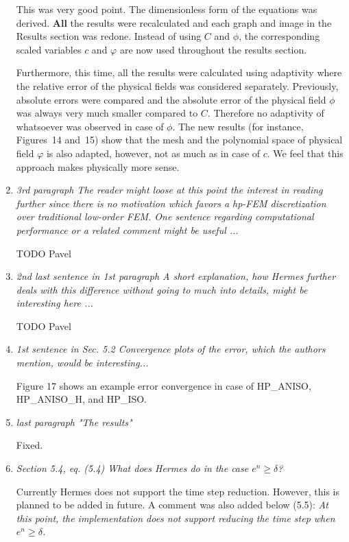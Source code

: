 \documentclass[mathpazo]{cicp}
\begin{document}
\begin{enumerate}
This was very good point. The dimensionless form of the equations was derived. $\mathbf{All}$ the
results were recalculated and each graph and image in the Results section was redone.
Instead of using $C$
and $\phi$, the corresponding scaled variables $c$ and $\varphi$ are now used throughout the results section.

Furthermore, this time, all the results were calculated using adaptivity where the relative error
of the physical fields was considered separately.  Previously, absolute errors were compared
and the absolute error of the physical field $\phi$ was always very  much smaller compared to
$C$. Therefore no adaptivity of whatsoever was observed in case of $\phi$. The new results
(for instance, Figures~14 and~15) show that the mesh and the polynomial
space of physical field $\varphi$ is also adapted, however, not as much as in case of $c$.
We feel that this approach makes physically more sense.

\item \emph{3rd paragraph The reader might loose at this point the interest in reading further since there
is no motivation which favors a hp-FEM discretization over traditional low-order FEM. One
sentence regarding computational performance or a related comment might be useful ...}

TODO Pavel

\item \emph{2nd last sentence in 1st paragraph A short explanation, how Hermes further deals with this
difference without going to much into details, might be interesting here ...}

TODO Pavel

\item \emph{1st sentence in Sec. 5.2 Convergence plots of the error, which the authors mention, would be interesting...}

Figure 17 shows an example error convergence in case of HP\_ANISO, HP\_ANISO\_H, and HP\_ISO.

\item \emph{last paragraph "The results"}

Fixed.

\item \emph{Section 5.4, eq. (5.4) What does Hermes do in the case $e^n\geq\delta$?}

Currently Hermes does not support the time step reduction. However, this is planned to be added
in future. A comment was also added below (5.5): \emph{At this point,
the implementation does not support reducing the time step when $e^n \geq \delta$.}

\end{enumerate}
\end{document}
